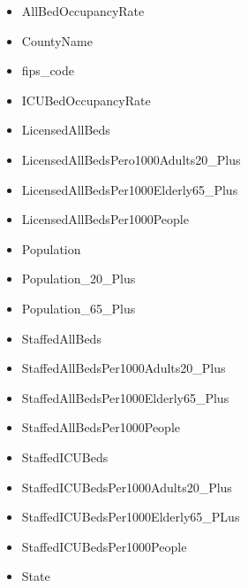 \documentclass[11pt]{article}
\begin{document}
\begin{itemize}
    \item AllBedOccupancyRate
    \item CountyName
    \item fips\_code
    \item ICUBedOccupancyRate
    \item LicensedAllBeds
    \item LicensedAllBedsPero1000Adults20\_Plus
    \item LicensedAllBedsPer1000Elderly65\_Plus
    \item LicensedAllBedsPer1000People
    \item Population
    \item Population\_20\_Plus
    \item Population\_65\_Plus
    \item StaffedAllBeds
    \item StaffedAllBedsPer1000Adults20\_Plus
    \item StaffedAllBedsPer1000Elderly65\_Plus
    \item StaffedAllBedsPer1000People
    \item StaffedICUBeds
    \item StaffedICUBedsPer1000Adults20\_Plus
    \item StaffedICUBedsPer1000Elderly65\_PLus
    \item StaffedICUBedsPer1000People
    \item State
\end{itemize}






%
\end{document}
